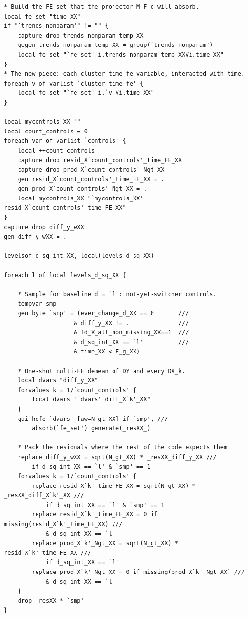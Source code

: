 \documentclass[11pt]{article}
\newcommand{\1}{\mathbb{1}}
\begin{document}
\begin{lstlisting}
* Build the FE set that the projector M_F_d will absorb.
local fe_set "time_XX"
if "`trends_nonparam'" != "" {
    capture drop trends_nonparam_temp_XX
    gegen trends_nonparam_temp_XX = group(`trends_nonparam')
    local fe_set "`fe_set' i.trends_nonparam_temp_XX#i.time_XX"
}
* The new piece: each cluster_time_fe variable, interacted with time.
foreach v of varlist `cluster_time_fe' {
    local fe_set "`fe_set' i.`v'#i.time_XX"
}

local mycontrols_XX ""
local count_controls = 0
foreach var of varlist `controls' {
    local ++count_controls
    capture drop resid_X`count_controls'_time_FE_XX
    capture drop prod_X`count_controls'_Ngt_XX
    gen resid_X`count_controls'_time_FE_XX = .
    gen prod_X`count_controls'_Ngt_XX = .
    local mycontrols_XX "`mycontrols_XX' resid_X`count_controls'_time_FE_XX"
}
capture drop diff_y_wXX
gen diff_y_wXX = .

levelsof d_sq_int_XX, local(levels_d_sq_XX)

foreach l of local levels_d_sq_XX {

    * Sample for baseline d = `l': not-yet-switcher controls.
    tempvar smp
    gen byte `smp' = (ever_change_d_XX == 0       ///
                    & diff_y_XX != .              ///
                    & fd_X_all_non_missing_XX==1  ///
                    & d_sq_int_XX == `l'          ///
                    & time_XX < F_g_XX)

    * One-shot multi-FE demean of DY and every DX_k.
    local dvars "diff_y_XX"
    forvalues k = 1/`count_controls' {
        local dvars "`dvars' diff_X`k'_XX"
    }
    qui hdfe `dvars' [aw=N_gt_XX] if `smp', ///
        absorb(`fe_set') generate(_resXX_)

    * Pack the residuals where the rest of the code expects them.
    replace diff_y_wXX = sqrt(N_gt_XX) * _resXX_diff_y_XX ///
        if d_sq_int_XX == `l' & `smp' == 1
    forvalues k = 1/`count_controls' {
        replace resid_X`k'_time_FE_XX = sqrt(N_gt_XX) * _resXX_diff_X`k'_XX ///
            if d_sq_int_XX == `l' & `smp' == 1
        replace resid_X`k'_time_FE_XX = 0 if missing(resid_X`k'_time_FE_XX) ///
            & d_sq_int_XX == `l'
        replace prod_X`k'_Ngt_XX = sqrt(N_gt_XX) * resid_X`k'_time_FE_XX ///
            if d_sq_int_XX == `l'
        replace prod_X`k'_Ngt_XX = 0 if missing(prod_X`k'_Ngt_XX) ///
            & d_sq_int_XX == `l'
    }
    drop _resXX_* `smp'
}
\end{lstlisting}
\end{document}
